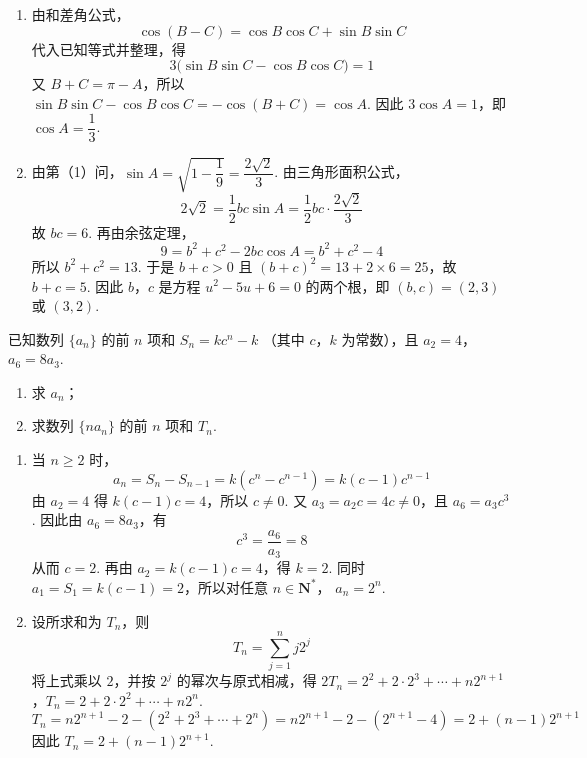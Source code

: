 \begin{solution}
\begin{enumerate}
\item 由和差角公式，
\[
\cos(B-C)=\cos B\cos C+\sin B\sin C
\]
代入已知等式并整理，得
\[
3\bigl(\sin B\sin C-\cos B\cos C\bigr)=1
\]
又 \(B+C=\pi-A\)，所以
\(\sin B\sin C-\cos B\cos C=-\cos(B+C)=\cos A\). 因此
\(3\cos A=1\)，即 \(\cos A=\dfrac13\).

\item 由第（1）问，\(\sin A=\sqrt{1-\dfrac19}=\dfrac{2\sqrt2}{3}\). 由三角形面积公式，
\[
2\sqrt2=\frac12bc\sin A
 =\frac12bc\cdot\frac{2\sqrt2}{3}
\]
故 \(bc=6\). 再由余弦定理，
\[
9=b^2+c^2-2bc\cos A
 =b^2+c^2-4
\]
所以 \(b^2+c^2=13\). 于是 \(b+c>0\) 且
\((b+c)^2=13+2\times6=25\)，故 \(b+c=5\). 因此 \(b\)，\(c\) 是方程
\(u^2-5u+6=0\) 的两个根，即 \((b,c)=(2,3)\) 或 \((3,2)\).
\end{enumerate}
\end{solution}

\begin{problem}
已知数列 \(\{a_{n}\}\) 的前 \(n\) 项和 \(S_{n} = kc^{n} - k\) （其中 \(c\)，\(k\) 为常数），且 \(a_{2} = 4\)，\(a_{6} = 8a_{3}\).
\begin{enumerate}
\item 求 \(a_{n}\)；
\item 求数列 \( \{na_{n}\} \) 的前 \(n\) 项和 \( T_{n} \).
\end{enumerate}
\end{problem}

\begin{solution}
\begin{enumerate}
\item 当 \(n\geqslant2\) 时，
\[
a_n=S_n-S_{n-1}=k(c^n-c^{n-1})=k(c-1)c^{n-1}
\]
由 \(a_2=4\) 得 \(k(c-1)c=4\)，所以 \(c\neq0\). 又
\(a_3=a_2c=4c\neq0\)，且 \(a_6=a_3c^3\). 因此由
\(a_6=8a_3\)，有
\[
c^3=\frac{a_6}{a_3}=8
\]
从而 \(c=2\). 再由 \(a_2=k(c-1)c=4\)，得 \(k=2\). 同时
\(a_1=S_1=k(c-1)=2\)，所以对任意 \(n\in\mathbf N^*\)，
\(a_n=2^n\).

\item 设所求和为 \(T_n\)，则
\[
T_n=\sum_{j=1}^{n}j2^j
\]
将上式乘以 \(2\)，并按 \(2^j\) 的幂次与原式相减，得
\(2T_n=2^2+2\cdot2^3+\cdots+n2^{n+1}\)，\(T_n=2+2\cdot2^2+\cdots+n2^n\).
\[
T_n=n2^{n+1}-2-(2^2+2^3+\cdots+2^n)
 =n2^{n+1}-2-(2^{n+1}-4)
 =2+(n-1)2^{n+1}
\]
因此 \(T_n=2+(n-1)2^{n+1}\).
\end{enumerate}
\end{solution}

